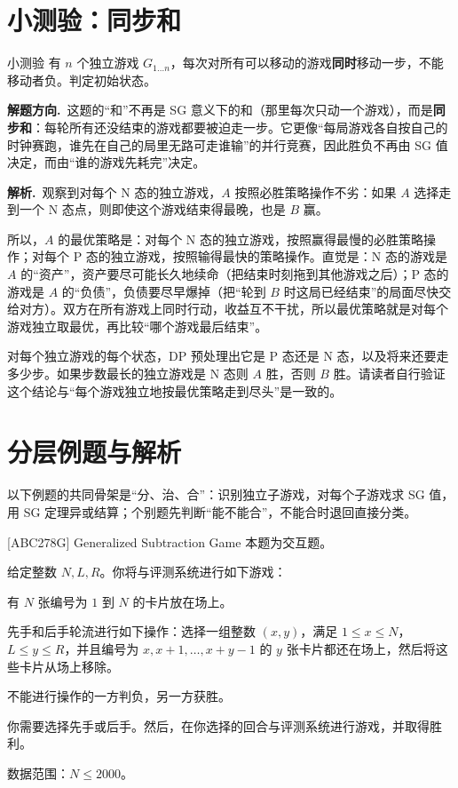 \documentclass[UTF8,a4paper,11pt,oneside,openany,fontset=fandol]{ctexbook}
\theoremstyle{definition}
\newcommand{\sol}{\par\noindent\textbf{解析.}\ }
\newcommand{\hint}{\par\noindent\textbf{解题方向.}\ }
\begin{document}
\section{小测验：同步和}
\begin{problem}{小测验}
有 $n$ 个独立游戏 $G_{1\ldots n}$，每次对所有可以移动的游戏\textbf{同时}移动一步，不能移动者负。判定初始状态。
\end{problem}

\hint 这题的“和”不再是 SG 意义下的和（那里每次只动一个游戏），而是\textbf{同步和}：每轮所有还没结束的游戏都要被迫走一步。它更像“每局游戏各自按自己的时钟赛跑，谁先在自己的局里无路可走谁输”的并行竞赛，因此胜负不再由 SG 值决定，而由“谁的游戏先耗完”决定。

\sol 观察到对每个 N 态的独立游戏，$A$ 按照必胜策略操作不劣：如果 $A$ 选择走到一个 N 态点，则即使这个游戏结束得最晚，也是 $B$ 赢。

所以，$A$ 的最优策略是：对每个 N 态的独立游戏，按照赢得最慢的必胜策略操作；对每个 P 态的独立游戏，按照输得最快的策略操作。直觉是：N 态的游戏是 $A$ 的“资产”，资产要尽可能长久地续命（把结束时刻拖到其他游戏之后）；P 态的游戏是 $A$ 的“负债”，负债要尽早爆掉（把“轮到 $B$ 时这局已经结束”的局面尽快交给对方）。双方在所有游戏上同时行动，收益互不干扰，所以最优策略就是对每个游戏独立取最优，再比较“哪个游戏最后结束”。

对每个独立游戏的每个状态，DP 预处理出它是 P 态还是 N 态，以及将来还要走多少步。如果步数最长的独立游戏是 N 态则 $A$ 胜，否则 $B$ 胜。请读者自行验证这个结论与“每个游戏独立地按最优策略走到尽头”是一致的。

\section{分层例题与解析}

以下例题的共同骨架是“分、治、合”：识别独立子游戏，对每个子游戏求 SG 值，用 SG 定理异或结算；个别题先判断“能不能合”，不能合时退回直接分类。

\begin{problem}{[ABC278G] Generalized Subtraction Game}
本题为交互题。

给定整数 $N,L,R$。你将与评测系统进行如下游戏：

有 $N$ 张编号为 $1$ 到 $N$ 的卡片放在场上。

先手和后手轮流进行如下操作：选择一组整数 $(x,y)$，满足 $1\le x\le N$，$L\le y\le R$，并且编号为 $x,x+1,\ldots,x+y-1$ 的 $y$ 张卡片都还在场上，然后将这些卡片从场上移除。

不能进行操作的一方判负，另一方获胜。

你需要选择先手或后手。然后，在你选择的回合与评测系统进行游戏，并取得胜利。

数据范围：$N\le2000$。
\end{problem}
\end{document}
